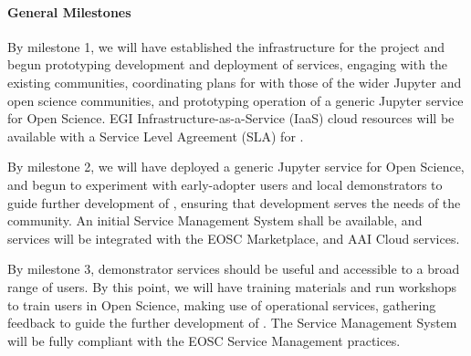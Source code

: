 


\paragraph{General Milestones}

\begin{milestones}
  {
  By milestone 1, we will have established the infrastructure
  for the project and begun prototyping development and deployment of services,
  engaging with the existing communities,
  coordinating plans for \TheProject with those of the wider Jupyter and open science communities,
  and prototyping operation of a generic Jupyter service
  for Open Science.
  EGI Infrastructure-as-a-Service (IaaS) cloud resources will be available with a
  Service Level Agreement (SLA) for \TheProject.
  }

  {
  By milestone 2, we will have deployed a generic Jupyter service for Open Science, and begun to experiment with early-adopter
  users and local demonstrators to guide further development of \TheProject,
  ensuring that development serves the needs of the community.
  An initial \TheProject Service Management System shall be available,
  and \TheProject services will be integrated with the EOSC Marketplace,
  and AAI Cloud services.
  }

  {
  By milestone 3, demonstrator services should be useful and accessible
  to a broad range of users.
  By this point, we will have training materials and run
  workshops to train users in Open Science,
  making use of operational \TheProject services,
  gathering feedback to guide the further development of \TheProject.
  The \TheProject Service Management System will be fully compliant with
  the EOSC Service Management practices.
  }


\end{milestones}
